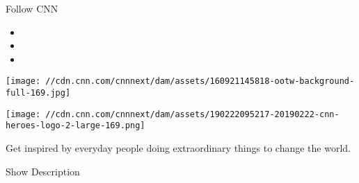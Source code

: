 Follow CNN

\begin{itemize}
\item
\item
\item
\end{itemize}

\texttt{[image: //cdn.cnn.com/cnnnext/dam/assets/160921145818-ootw-background-full-169.jpg]}

\texttt{[image: //cdn.cnn.com/cnnnext/dam/assets/190222095217-20190222-cnn-heroes-logo-2-large-169.png]}

Get inspired by everyday people doing extraordinary things to change the
world.

Show Description

\href{//facebook.com/CNNHeroes}{}

\href{//twitter.com/CNNHeroes}{}

\href{//www.instagram.com/cnnheroes}{}

\hypertarget{-}{%
\subsection{~}\label{-}}

